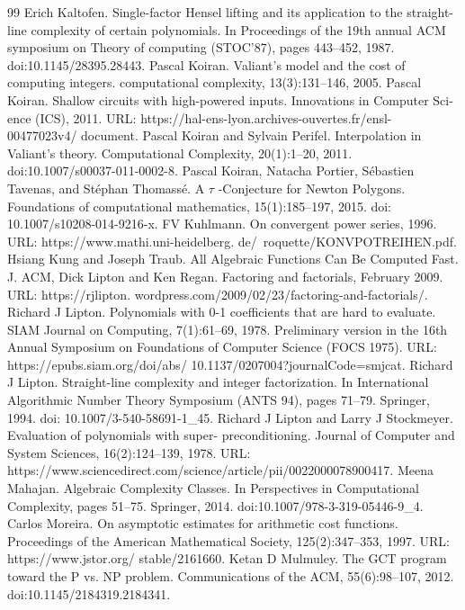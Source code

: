 \begin{thebibliography}{99}
 Erich Kaltofen. Single-factor Hensel lifting and its application to the straight-line complexity of certain polynomials. In Proceedings of the 19th annual ACM symposium on Theory of computing (STOC’87), pages 443–452, 1987. doi:10.1145/28395.28443.
 Pascal Koiran. Valiant’s model and the cost of computing integers. computational complexity, 13(3):131–146, 2005.
 Pascal Koiran. Shallow circuits with high-powered inputs. Innovations in Computer Sci- ence (ICS), 2011. URL: https://hal-ens-lyon.archives-ouvertes.fr/ensl-00477023v4/ document.
 Pascal Koiran and Sylvain Perifel. Interpolation in Valiant’s theory. Computational Complexity, 20(1):1–20, 2011. doi:10.1007/s00037-011-0002-8.
 Pascal Koiran, Natacha Portier, Sébastien Tavenas, and Stéphan Thomassé. A $\tau$ -Conjecture for Newton Polygons. Foundations of computational mathematics, 15(1):185–197, 2015. doi: 10.1007/s10208-014-9216-x.
 FV Kuhlmann. On convergent power series, 1996. URL: https://www.mathi.uni-heidelberg. de/~roquette/KONVPOTREIHEN.pdf.
 Hsiang Kung and Joseph Traub. All Algebraic Functions Can Be Computed Fast. J. ACM,
 Dick Lipton and Ken Regan. Factoring and factorials, February 2009. URL: https://rjlipton. wordpress.com/2009/02/23/factoring-and-factorials/.
 Richard J Lipton. Polynomials with 0-1 coefficients that are hard to evaluate. SIAM Journal on Computing, 7(1):61–69, 1978. Preliminary version in the 16th Annual Symposium on Foundations of Computer Science (FOCS 1975). URL: https://epubs.siam.org/doi/abs/ 10.1137/0207004?journalCode=smjcat.
 Richard J Lipton. Straight-line complexity and integer factorization. In International Algorithmic Number Theory Symposium (ANTS 94), pages 71–79. Springer, 1994. doi: 10.1007/3-540-58691-1\_45.
 Richard J Lipton and Larry J Stockmeyer. Evaluation of polynomials with super- preconditioning. Journal of Computer and System Sciences, 16(2):124–139, 1978. URL: https://www.sciencedirect.com/science/article/pii/0022000078900417.
 Meena Mahajan. Algebraic Complexity Classes. In Perspectives in Computational Complexity, pages 51–75. Springer, 2014. doi:10.1007/978-3-319-05446-9\_4.
 Carlos Moreira. On asymptotic estimates for arithmetic cost functions. Proceedings of the American Mathematical Society, 125(2):347–353, 1997. URL: https://www.jstor.org/ stable/2161660.
 Ketan D Mulmuley. The GCT program toward the P vs. NP problem. Communications of the ACM, 55(6):98–107, 2012. doi:10.1145/2184319.2184341.

\end{thebibliography}
